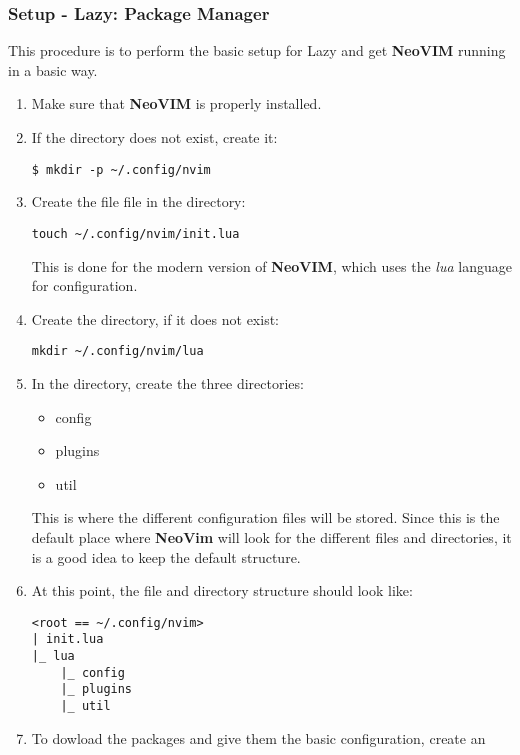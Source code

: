 \subsubsection{Setup - Lazy: Package Manager}
This procedure is to perform the basic setup for Lazy and get \textbf{NeoVIM} running in a basic
way.
\begin{enumerate}
    \item Make sure that \textbf{NeoVIM} is properly installed.
    \item If the directory  does not exist,
    create it:
    \begin{verbatim}
$ mkdir -p ~/.config/nvim
    \end{verbatim}
    \item Create the file  file in the directory:
    \begin{verbatim}
touch ~/.config/nvim/init.lua
    \end{verbatim}
    This is done for the modern version of \textbf{NeoVIM}, which uses the \textit{lua} language for
    configuration.
    \item Create the  directory, if
    it does not exist:
    \begin{verbatim}
mkdir ~/.config/nvim/lua
    \end{verbatim}
    \item In the  directory, create the three directories:
    \begin{itemize}
        \item config
        \item plugins
        \item util
    \end{itemize}
    This is where the different configuration files will be stored. Since this is the default place
    where \textbf{NeoVim} will look for the different files and directories, it is a good idea to
    keep the default structure.
    \item At this point, the file and directory structure should look like:
    \begin{verbatim}
<root == ~/.config/nvim>
| init.lua
|_ lua
    |_ config
    |_ plugins
    |_ util
    \end{verbatim}
    \item To dowload the packages and give them the basic configuration, create an

\end{enumerate}
